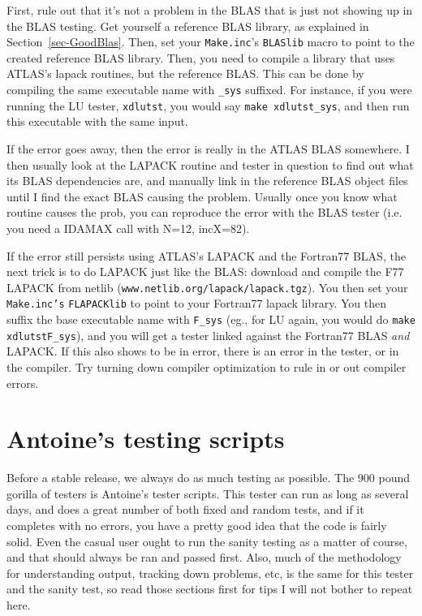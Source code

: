 \documentclass[11pt]{article}
\begin{document}
First, rule out that it's not a problem in the BLAS that is just not showing
up in the BLAS testing.  Get yourself a reference BLAS library, as explained
in Section~\ref{sec-GoodBlas}.  Then, set your {\tt Make.inc}'s {\tt BLASlib}
macro to point to the created reference BLAS library.  Then, you need to
compile a library that uses ATLAS's lapack routines, but the reference
BLAS.  This can be done by compiling the same executable name with {\tt \_sys}
suffixed.  For instance, if you were running the LU tester, {\tt xdlutst},
you would say {\tt make xdlutst\_sys}, and then run this executable with
the same input.

If the error goes away, then the error is really in the ATLAS BLAS somewhere.
I then usually look at the LAPACK routine and tester in question to find out
what its BLAS dependencies are, and manually link in the reference BLAS
object files until I find the exact BLAS causing the problem.  Usually
once you know what routine causes the prob, you can reproduce the error
with the BLAS tester (i.e. you need a IDAMAX call with N=12, incX=82).

If the error still persists using ATLAS's LAPACK and the Fortran77 BLAS,
the next trick is to do LAPACK just like the BLAS: download and compile the F77
LAPACK from netlib ({\tt www.netlib.org/lapack/lapack.tgz}).  You then
set your {\tt Make.inc's} {\tt FLAPACKlib} to point to your Fortran77 lapack
library.  You then suffix the base executable name with {\tt F\_sys} (eg., for
LU again, you would do {\tt make xdlutstF\_sys}), and
you will get a tester linked against the Fortran77 BLAS {\em and} LAPACK.
If this also shows to be in error, there is an error in the tester, or in
the compiler.  Try turning down compiler optimization to rule in or out
compiler errors.

\section{Antoine's testing scripts}

Before a stable release, we always do as much testing as possible.  The
900 pound gorilla of testers is Antoine's tester scripts.
This tester can run as long as several days, and does a great number of
both fixed and random tests, and if it completes with no errors, you have
a pretty good
idea that the code is fairly solid. 
Even the casual
user ought to run the sanity testing as a matter of course, and that should
always be ran and passed first.  Also, much of the methodology for 
understanding output, tracking down problems, etc, is the same for this
tester and the sanity test, so read those sections first for tips I will
not bother to repeat here.
\end{document}
